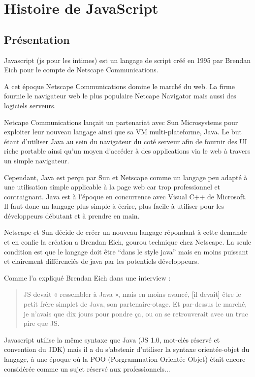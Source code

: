 \section{Histoire de JavaScript}
\label{ch:histoire}

\subsection{Présentation}


Javascript (js pour les intimes) est un langage de script créé en 1995 par Brendan Eich pour le compte de Netscape Communications.

A cet époque Netscape Communications domine le marché du web. La firme fournie le navigateur web le plus populaire Netcape Navigator mais aussi des logiciels serveurs.

Netcape Communications lançait un partenariat avec Sun Microsystems pour exploiter leur nouveau langage ainsi que sa VM multi-plateforme, Java. Le but étant d’utiliser Java au sein du navigateur du coté serveur afin de fournir des UI riche portable ainsi qu’un moyen d’accéder à des applications via le web à travers un simple navigateur.

Cependant, Java est perçu par Sun et Netscape comme un langage peu adapté à une utilisation simple applicable à la page web car trop professionnel et contraignant. Java est à l’époque en concurrence avec Visual C++ de Microsoft. Il faut donc un langage plus simple à écrire, plus facile à utiliser pour les développeurs débutant et à prendre en main.

Netscape et Sun décide de créer un nouveau langage répondant à cette demande et en confie la création a Brendan Eich, gourou technique chez Netscape. La seule condition est que le langage doit être “dans le style java” mais en moins puissant et clairement différenciés de java par les potentiels développeurs.

Comme l’a expliqué Brendan Eich dans une interview :


\begin{quotation}


JS devait « ressembler à Java », mais en moins avancé, [il devait] être le petit frère simplet de Java, son partenaire-otage. Et par-dessus le marché, je n’avais que dix jours pour pondre ça, ou on se retrouverait avec un truc pire que JS.

\end{quotation}

Javascript utilise la même syntaxe que Java (JS 1.0, mot-clés réservé et convention du JDK) mais il a du s’abstenir d’utiliser la syntaxe orientée-objet du langage, à une époque où la POO (Porgrammation Orientée Objet) était encore considérée comme un sujet réservé aux professionnels...

